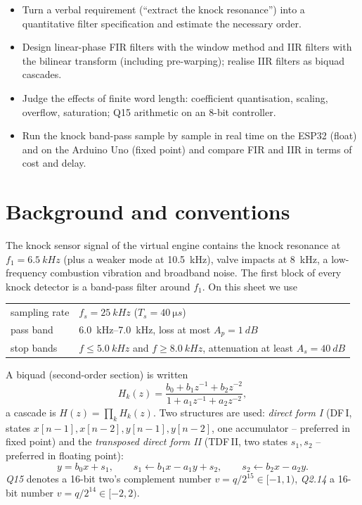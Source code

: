 
\begin{goals}
\begin{itemize}
  \item Turn a verbal requirement (``extract the knock resonance'') into a
    quantitative filter specification and estimate the necessary order.
  \item Design linear-phase FIR filters with the window method and IIR filters
    with the bilinear transform (including pre-warping); realise IIR filters as
    biquad cascades.
  \item Judge the effects of finite word length: coefficient quantisation,
    scaling, overflow, saturation; Q15 arithmetic on an 8-bit controller.
  \item Run the knock band-pass sample by sample in real time on the ESP32
    (float) and on the Arduino Uno (fixed point) and compare FIR and IIR
    in terms of cost and delay.
\end{itemize}
\end{goals}

\section*{Background and conventions}

The knock sensor signal of the virtual engine contains the knock resonance
at $f_1=\SI{6.5}{kHz}$ (plus a weaker mode at \SI{10.5}{kHz}), valve impacts
at \SI{8}{kHz}, a low-frequency combustion vibration and broadband noise.
The first block of every knock detector is a band-pass filter around $f_1$.
On this sheet we use
\begin{center}
\small
\begin{tabular}{@{}ll@{}}
\toprule
sampling rate & $f_s = \SI{25}{kHz}$ ($T_s=\SI{40}{\micro s}$)\\
pass band & \SIrange{6.0}{7.0}{kHz}, loss at most $A_p=\SI{1}{dB}$\\
stop bands & $f\le\SI{5.0}{kHz}$ and $f\ge\SI{8.0}{kHz}$, attenuation at least $A_s=\SI{40}{dB}$\\
\bottomrule
\end{tabular}
\end{center}
A biquad (second-order section) is written
\[
  H_k(z)=\frac{b_0+b_1z^{-1}+b_2z^{-2}}{1+a_1z^{-1}+a_2z^{-2}},
\]
a cascade is $H(z)=\prod_k H_k(z)$. Two structures are used:
\emph{direct form I} (DF\,I, states $x[n-1],x[n-2],y[n-1],y[n-2]$, one
accumulator -- preferred in fixed point) and the \emph{transposed direct
form II} (TDF\,II, two states $s_1,s_2$ -- preferred in floating point):
\[
  y = b_0x+s_1,\qquad s_1\leftarrow b_1x-a_1y+s_2,\qquad s_2\leftarrow b_2x-a_2y .
\]
\emph{Q15} denotes a 16-bit two's complement number $v=q/2^{15}\in[-1,1)$,
\emph{Q2.14} a 16-bit number $v=q/2^{14}\in[-2,2)$.

